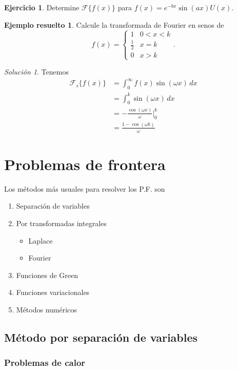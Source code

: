 \documentclass[11pt,letterpaper,draft]{report}
\theoremstyle{plain}
\theoremstyle{definition}
\newtheorem{solved}[theorem]{Ejemplo resuelto}
\newtheorem{exercise}[theorem]{Ejercicio}
\theoremstyle{remark}
\newtheorem*{solution}{Solución}
\newcommand\<{\langle}
\renewcommand\>{\rangle}
\let\cal\mathcal
\begin{document}
\begin{exercise}
  Determine $\cal F\{f(x)\}$ para $f(x)=e^{-bx}\sin(ax)U(x)$.
\end{exercise}

\begin{solved}
  Calcule la transformada de Fourier en senos de
  \[
    f(x)=
    \begin{cases}
      1 & 0<x<k \\
      \frac{1}{2} & x=k \\
      0 & x>k
    \end{cases}
  .\]
  \begin{solution}
    Tenemos
    \begin{align*}
      \cal F_s\{f(x)\}
      &= \int_{0}^{\infty}f(x)\sin(\omega x)\,dx \\
      &= \int_{0}^{k}\sin(\omega x)\,dx \\
      &= -\frac{\cos(\omega x)}{\omega}\Big|_{0}^{k} \\
      &= \frac{1-\cos(\omega k)}{\omega}
    \end{align*}
  \end{solution}
\end{solved}

\chapter{Problemas de frontera} %

Los métodos más usuales para resolver los P.F. son
\begin{enumerate}
  \item Separación de variables
  \item Por transformadas integrales
  \begin{itemize}
    \item   Laplace
    \item Fourier   
  \end{itemize}
  \item Funciones de Green
  \item Funciones variacionales
  \item Métodos numéricos
\end{enumerate}

\section{Método por separación de variables}

\subsection{Problemas de calor}
\end{document}
